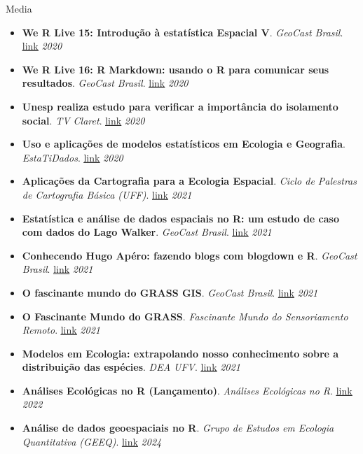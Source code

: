 \documentclass{resume}
\begin{document}
\begin{rSection}{Media}
\begin{itemize}
\item {\bf We R Live 15: Introdução à estatística Espacial V}. {\it GeoCast Brasil}. \href{https://youtu.be/IeGTr7mjZIc}{\underline{link}} \hfill{\em 2020}
\item {\bf We R Live 16: R Markdown: usando o R para comunicar seus resultados}. {\it GeoCast Brasil}. \href{https://youtu.be/6oPZ5sGt6LA}{\underline{link}} \hfill{\em 2020}
\item {\bf Unesp realiza estudo para verificar a importância do isolamento social}. {\it TV Claret}. \href{https://youtu.be/RP6rUQpberE}{\underline{link}} \hfill{\em 2020}
\item {\bf Uso e aplicações de modelos estatísticos em Ecologia e Geografia}. {\it EstaTiDados}. \href{https://youtu.be/pUavO7dVRGk}{\underline{link}} \hfill{\em 2020}
\item {\bf Aplicações da Cartografia para a Ecologia Espacial}. {\it Ciclo de Palestras de Cartografia Básica (UFF)}. \href{https://youtu.be/csh1BPH_H8I}{\underline{link}} \hfill{\em 2021}
\item {\bf Estatística e análise de dados espaciais no R: um estudo de caso com dados do Lago Walker}. {\it GeoCast Brasil}. \href{https://youtu.be/csh1BPH_H8I}{\underline{link}} \hfill{\em 2021}
\item {\bf Conhecendo Hugo Apéro: fazendo blogs com blogdown e R}. {\it GeoCast Brasil}. \href{https://youtu.be/4Ixl2RjZEYI}{\underline{link}} \hfill{\em 2021}
\item {\bf O fascinante mundo do GRASS GIS}. {\it GeoCast Brasil}. \href{https://youtu.be/_pohWjE4eiA}{\underline{link}} \hfill{\em 2021}
\item {\bf O Fascinante Mundo do GRASS}. {\it Fascinante Mundo do Sensoriamento Remoto}. \href{https://youtu.be/vp6frd89y9E}{\underline{link}} \hfill{\em 2021}
\item {\bf Modelos em Ecologia: extrapolando nosso conhecimento sobre a distribuição das espécies}. {\it DEA UFV}. \href{https://youtu.be/Kcc-eIhqtlE}{\underline{link}} \hfill{\em 2021}
\item {\bf Análises Ecológicas no R (Lançamento)}. {\it Análises Ecológicas no R}. \href{https://youtu.be/jYrneB95nes}{\underline{link}} \hfill{\em 2022}
\item {\bf Análise de dados geoespaciais no R}. {\it Grupo de Estudos em Ecologia Quantitativa (GEEQ)}. \href{https://youtu.be/qySBvCu7IS0}{\underline{link}} \hfill{\em 2024}	
\end{itemize} 


\end{rSection}
\end{document}
